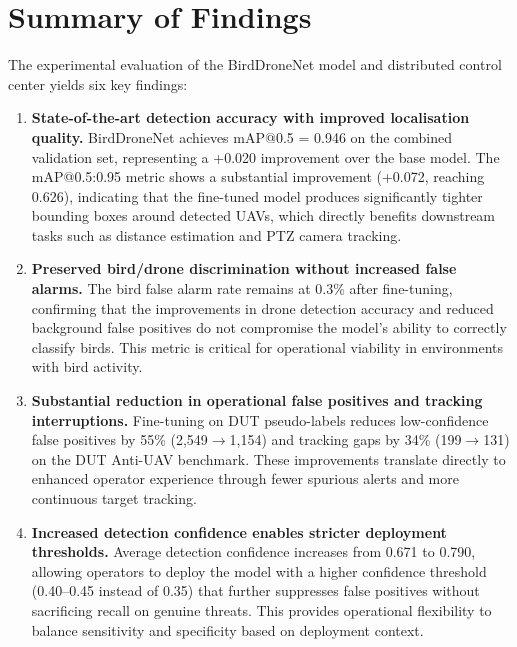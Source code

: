 \documentclass[12pt,a4paper]{report}
\begin{document}
\section{Summary of Findings}

The experimental evaluation of the BirdDroneNet model and distributed control center yields six key findings:

\begin{enumerate}
  \item \textbf{State-of-the-art detection accuracy with improved localisation quality.}
        BirdDroneNet achieves mAP@0.5 = 0.946 on the combined validation set, representing
        a +0.020 improvement over the base model. The mAP@0.5:0.95 metric shows a
        substantial improvement (+0.072, reaching 0.626), indicating that the fine-tuned model
        produces significantly tighter bounding boxes around detected UAVs, which directly
        benefits downstream tasks such as distance estimation and PTZ camera tracking.
  
  \item \textbf{Preserved bird/drone discrimination without increased false alarms.}
        The bird false alarm rate remains at 0.3\% after fine-tuning, confirming that the
        improvements in drone detection accuracy and reduced background false positives do
        not compromise the model's ability to correctly classify birds. This metric is
        critical for operational viability in environments with bird activity.
  
  \item \textbf{Substantial reduction in operational false positives and tracking interruptions.}
        Fine-tuning on DUT pseudo-labels reduces low-confidence false positives by 55\%
        (2,549$\to$1,154) and tracking gaps by 34\% (199$\to$131) on the DUT Anti-UAV benchmark.
        These improvements translate directly to enhanced operator experience through fewer
        spurious alerts and more continuous target tracking.
  
  \item \textbf{Increased detection confidence enables stricter deployment thresholds.}
        Average detection confidence increases from 0.671 to 0.790, allowing operators to
        deploy the model with a higher confidence threshold (0.40--0.45 instead of 0.35)
        that further suppresses false positives without sacrificing recall on genuine threats.
        This provides operational flexibility to balance sensitivity and specificity based
        on deployment context.
  

\end{enumerate}
\end{document}
